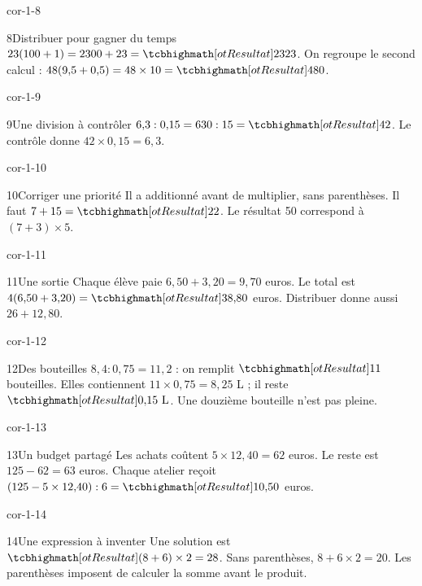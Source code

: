 \begin{blocLivre}{cor-1-8}\begin{corrige}{8}{Distribuer pour gagner du temps}
$23(100+1)=2300+23=\res{2323}$. On regroupe le second calcul : $48(9{,}5+0{,}5)=48\times10=\res{480}$.
\end{corrige}\end{blocLivre}
\begin{blocLivre}{cor-1-9}\begin{corrige}{9}{Une division à contrôler}
$6{,}3:0{,}15=630:15=\res{42}$. Le contrôle donne $42\times0{,}15=6{,}3$.
\end{corrige}\end{blocLivre}
\begin{blocLivre}{cor-1-10}\begin{corrige}{10}{Corriger une priorité}
Il a additionné avant de multiplier, sans parenthèses. Il faut $7+15=\res{22}$. Le résultat 50 correspond à $(7+3)\times5$.
\end{corrige}\end{blocLivre}
\begin{blocLivre}{cor-1-11}\begin{corrige}{11}{Une sortie}
Chaque élève paie $6{,}50+3{,}20=9{,}70$ euros. Le total est $4(6{,}50+3{,}20)=\res{38{,}80}$ euros. Distribuer donne aussi $26+12{,}80$.
\end{corrige}\end{blocLivre}
\begin{blocLivre}{cor-1-12}\begin{corrige}{12}{Des bouteilles}
$8{,}4:0{,}75=11{,}2$ : on remplit $\res{11}$ bouteilles. Elles contiennent $11\times0{,}75=8{,}25$ L ; il reste $\res{0{,}15\ \mathrm L}$. Une douzième bouteille n’est pas pleine.
\end{corrige}\end{blocLivre}
\begin{blocLivre}{cor-1-13}\begin{corrige}{13}{Un budget partagé}
Les achats coûtent $5\times12{,}40=62$ euros. Le reste est $125-62=63$ euros. Chaque atelier reçoit $(125-5\times12{,}40):6=\res{10{,}50}$ euros.
\end{corrige}\end{blocLivre}
\begin{blocLivre}{cor-1-14}\begin{corrige}{14}{Une expression à inventer}
Une solution est $\res{(8+6)\times2=28}$. Sans parenthèses, $8+6\times2=20$. Les parenthèses imposent de calculer la somme avant le produit.
\end{corrige}\end{blocLivre}
